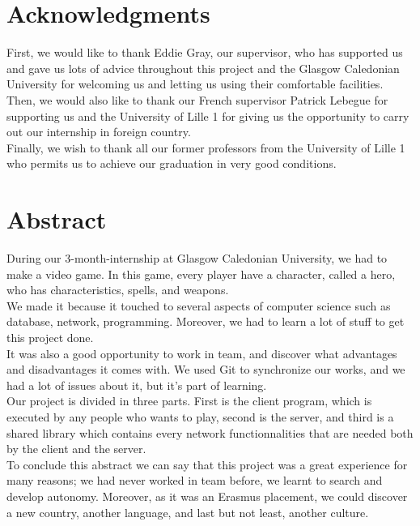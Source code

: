 \documentclass{scrreprt}
\begin{document}


\chapter*{Acknowledgments} %
First, we would like to thank Eddie Gray, our supervisor, who has supported us and
gave us lots of advice throughout this project and the Glasgow Caledonian University for
welcoming us and letting us using their comfortable facilities.\\

	  Then, we would also like to thank our French supervisor Patrick Lebegue for supporting us
	  and the University of Lille 1 for giving us the opportunity to carry out our internship in foreign country.\\

	  Finally, we wish to thank all our former professors from the University of Lille 1 who
	  permits us to achieve our graduation in very good conditions.\\

	  \chapter*{Abstract}
	  During our 3-month-internship at Glasgow Caledonian University, we had to make a video game.
	  In this game, every player have a character, called a hero, who has characteristics, spells, and weapons.\\

	  We made it because it touched to several aspects of computer science such as database, network,
	  programming. Moreover, we had to learn a lot of stuff to get this project done.\\
		  It was also a good opportunity to work in team, and discover what advantages and disadvantages it comes with.
		  We used Git to synchronize our works, and we had a lot of issues about it, but it's part of learning.\\

		  Our project is divided in three parts. First is the client program, which is executed by any people who wants to play,
		  second is the server, and third is a shared library which contains every network functionnalities that are needed both
		  by the client and the server.\\

		  To conclude this abstract we can say that this project was a great experience for many
		  reasons; we had never worked in team before, we learnt to search and develop
		  autonomy. Moreover, as it was an Erasmus placement, we could discover a new country,
		  another language, and last but not least, another culture.
\end{document}
